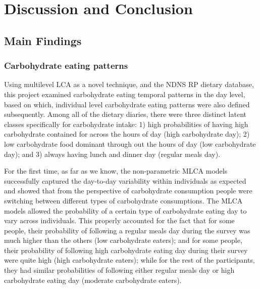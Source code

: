 
\chapter{Discussion and Conclusion} %

\label{Chapter 4} %






\section{Main Findings}

\subsection{Carbohydrate eating patterns}

Using multilevel LCA as a novel technique, and the NDNS RP dietary database, this project examined carbohydrate eating temporal patterns in the day level, based on which, individual level carbohydrate eating patterns were also defined subsequently. Among all of the dietary diaries, there were three distinct latent classes specifically for carbohydrate intake: 1) high probabilities of having high carbohydrate contained for across the hours of day (high carbohydrate day); 2) low carbohydrate food dominant through out the hours of day (low carbohydrate day); and 3) always having lunch and dinner day (regular meals day). 

For the first time, as far as we know, the non-parametric MLCA models successfully captured the day-to-day variability within individuals as expected and showed that from the perspective of carbohydrate consumption people were switching between different types of carbohydrate consumptions. The MLCA models allowed the probability of a certain type of carbohydrate eating day to vary across individuals. This properly accounted for the fact that for some people, their probability of following a regular meals day during the survey was much higher than the others (low carbohydrate eaters); and for some people, their probability of following high carbohydrate eating day during their survey were quite high (high carbohydrate eaters); while for the rest of the participants, they had similar probabilities of following either regular meals day or high carbohydrate eating day (moderate carbohydrate eaters). 

